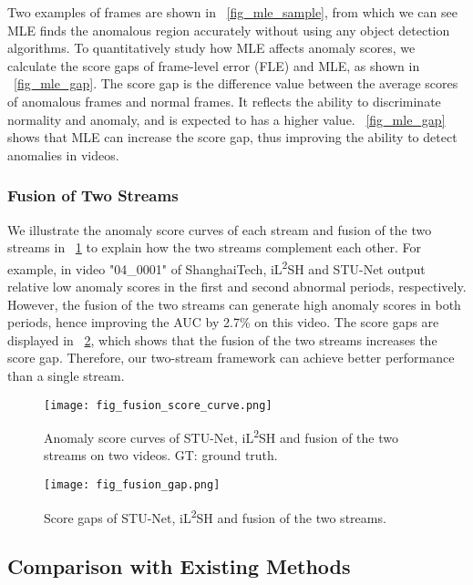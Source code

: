 \documentclass[lettersize,journal]{IEEEtran}
\begin{document}
Two examples of frames are shown in \figurename~\ref{fig_mle_sample}, from which we can see MLE finds the anomalous region accurately without using any object detection algorithms.
To quantitatively study how MLE affects anomaly scores, we calculate the score gaps of frame-level error (FLE) and MLE, as shown in \figurename~\ref{fig_mle_gap}.
The score gap is the difference value between the average scores of anomalous frames and normal frames.
It reflects the ability to discriminate normality and anomaly, and is expected to has a higher value.
\figurename~\ref{fig_mle_gap} shows that MLE can increase the score gap, thus improving the ability to detect anomalies in videos.

\subsubsection{Fusion of Two Streams}
We illustrate the anomaly score curves of each stream and fusion of the two streams in \figurename~\ref{fig_fusion_score_curve} to explain how the two streams complement each other.
For example, in video "04\_0001" of ShanghaiTech, iL\textsuperscript{2}SH and STU-Net output relative low anomaly scores in the first and second abnormal periods, respectively.
However, the fusion of the two streams can generate high anomaly scores in both periods, hence improving the AUC by 2.7\% on this video.
The score gaps are displayed in \figurename~\ref{fig_fusion_gap}, which shows that the fusion of the two streams increases the score gap.
Therefore, our two-stream framework can achieve better performance than a single stream.

\begin{figure}[!t]
	\centering
	\texttt{[image: fig\_fusion\_score\_curve.png]}
	\caption{Anomaly score curves of STU-Net, iL\textsuperscript{2}SH and fusion of the two streams on two videos. GT: ground truth.}
	\label{fig_fusion_score_curve}
\end{figure}

\begin{figure}[!t]
	\centering
	\texttt{[image: fig\_fusion\_gap.png]}
	\caption{Score gaps of STU-Net, iL\textsuperscript{2}SH and fusion of the two streams.}
	\label{fig_fusion_gap}
\end{figure}

\subsection{Comparison with Existing Methods}
\end{document}
